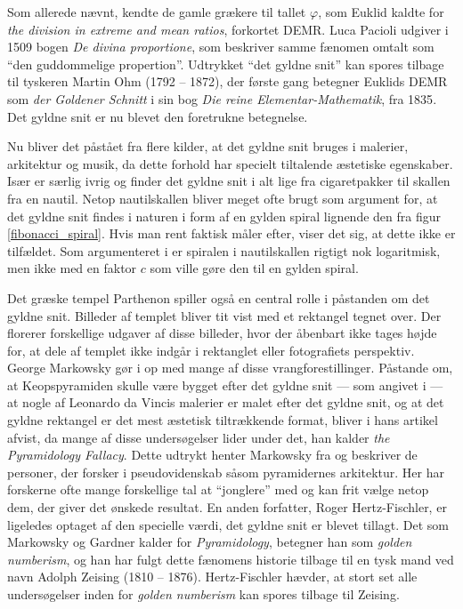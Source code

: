 {
Som allerede nævnt, kendte de gamle grækere til tallet $\varphi$, som
Euklid kaldte for \emph{the division in extreme and mean ratios},
forkortet DEMR. Luca Pacioli udgiver i 1509 bogen \emph{De divina
proportione}, som beskriver samme fænomen omtalt som ``den guddommelige
propertion''. Udtrykket ``det gyldne snit'' kan spores tilbage til
tyskeren Martin Ohm (1792 -- 1872), der første gang betegner Euklids DEMR
som \emph{der Goldener Schnitt} i sin bog \emph{Die reine
Elementar-Mathematik}, fra 1835\cite{Markowsky1992}. Det gyldne snit er
nu blevet den foretrukne betegnelse.

Nu bliver det påstået fra flere kilder, at det gyldne snit bruges i
malerier, arkitektur og musik, da dette forhold har specielt tiltalende
æstetiske
egenskaber\cite{GoldenNumber,RatioArt,Putz1995,Stakhov2006490,Boussora2004}.
Især \cite{GoldenNumber} er særlig ivrig og finder det gyldne snit i alt
lige fra cigaretpakker til skallen fra en nautil. Netop nautilskallen
bliver meget ofte brugt som argument for, at det gyldne snit findes i
naturen i form af en gylden spiral lignende den fra figur
\ref{fibonacci_spiral}. Hvis man rent faktisk måler efter,
viser det sig, at dette ikke er tilfældet. Som argumenteret i
\cite{Sharp2002} er spiralen i nautilskallen rigtigt nok logaritmisk,
men ikke med en faktor $c$ som ville gøre den til en gylden spiral.

Det græske tempel Parthenon spiller også en central rolle i påstanden om
det gyldne snit. Billeder af templet bliver tit vist med et rektangel
tegnet over. Der florerer forskellige udgaver af disse billeder, hvor
der åbenbart ikke tages højde for, at dele af templet ikke indgår i
rektanglet eller fotografiets perspektiv. George Markowsky gør i
\cite{Markowsky1992} op med mange af disse vrangforestillinger. Påstande
om, at Keopspyramiden skulle være bygget efter det gyldne snit --- som
angivet i \cite{Stakhov2006490} --- at nogle af Leonardo da Vincis malerier
er malet efter det gyldne snit, og at det gyldne rektangel er det mest
æstetisk tiltrækkende format\cite{GoldenNumber,RatioArt}, bliver i
hans artikel afvist, da mange af disse undersøgelser lider under det, han
kalder \emph{the Pyramidology Fallacy}. Dette udtrykt henter Markowsky
fra \cite{Gardner1952_2} og beskriver de personer, der forsker i
pseudovidenskab såsom pyramidernes arkitektur. Her har forskerne ofte
mange forskellige tal at ``jonglere'' med og kan frit vælge netop dem,
der giver det ønskede resultat. En anden forfatter, Roger
Hertz-Fischler, er ligeledes optaget af den specielle værdi, det gyldne
snit er blevet tillagt. Det som Markowsky og Gardner kalder for
\emph{Pyramidology}, betegner han som \emph{golden numberism}, og han har
fulgt dette fænomens historie tilbage til en tysk mand ved navn
Adolph Zeising (1810 -- 1876)\cite{Herz-Fischler2005}. Hertz-Fischler
hævder, at stort set alle undersøgelser inden for \emph{golden numberism}
kan spores tilbage til Zeising.

}
